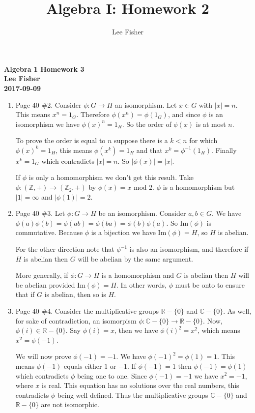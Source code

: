 \documentclass[12pt]{report}
\title{\textbf{Algebra I: Homework 2}}
\author{Lee Fisher}
\date{}
\begin{document}
\textbf{Algebra 1 Homework 3}\\
\indent \textbf{Lee Fisher}\\
\indent \textbf{2017-09-09}

\begin{enumerate}

\item Page 40 \#2. Consider $\phi: G \to H$ an isomorphism. Let $x \in G$ with
      $|x| = n$. This means $x^n=1_G$. Therefore $\phi(x^n) = \phi(1_G)$, and
      since $\phi$ is an isomorphism we have $\phi(x)^n = 1_H$. So the order of
      $\phi(x)$ is at most $n$.

      To prove the order is equal to $n$ suppose there is a $k<n$ for which
      $\phi(x)^k = 1_H$, this means $\phi(x^k) = 1_H$ and that $x^k =
      \phi^{-1}(1_H)$. Finally $x^k = 1_G$ which contradicts $|x|=n$. So
      $|\phi(x)| = |x|$.

      If $\phi$ is only a homomorphism we don't get this result. Take
      $\phi:(\mathbb{Z},+) \to (\mathbb{Z}_2,+)$ by $\phi(x) =x\textrm{ mod }2$.
      $\phi$ is a homomorphism but $|1| = \infty$ and $|\phi(1)| = 2$.\\

\item Page 40 \#3. Let $\phi: G \to H$ be an isomorphism. Consider $a,b \in G$.
      We have $\phi(a)\phi(b) = \phi(ab) = \phi(ba) = \phi(b)\phi(a)$. So
      $\textrm{Im}(\phi)$ is commutative. Because $\phi$ is a bijection we have
      $\textrm{Im}(\phi) = H$, so $H$ is abelian.

      For the other direction note that $\phi^{-1}$ is also an isomorphism, and
      therefore if $H$ is abelian then $G$ will be abelian by the same argument.

      More generally, if $\phi:G \to H$ is a homomorphism and $G$ is abelian
      then $H$ will be abelian provided $\textrm{Im}(\phi) = H$. In other words,
      $\phi$ must be onto to ensure that if $G$ is abelian, then so is $H$.\\

\item Page 40 \#4. Consider the multiplicative groups $\mathbb{R}-\{ 0\}$ and
      $\mathbb{C}-\{ 0\}$. As well, for sake of contradiction, an isomorpism
      $\phi: \mathbb{C}-\{ 0\} \to \mathbb{R}-\{ 0\}$. Now, $\phi(i) \in
      \mathbb{R}-\{ 0\}$. Say $\phi(i) = x$, then we have $\phi(i)^2 = x^2$,
      which means $x^2 = \phi(-1)$.

      We will now prove $\phi(-1) = -1$. We have $\phi(-1)^2 = \phi(1) = 1$.
      This means $\phi(-1)$ equals either $1$ or $-1$. If $\phi(-1) = 1$ then
      $\phi(-1) = \phi(1)$ which contradicts $\phi$ being one to one. Since
      $\phi(-1) = -1$ we have $x^2 = -1$, where $x$ is real. This equation has
      no solutions over the real numbers, this contradicts $\phi$ being well
      defined. Thus the multiplicative groups $\mathbb{C}-\{ 0\}$ and
      $\mathbb{R} -\{ 0\}$ are not isomorphic.\\


\end{enumerate}
\end{document}
